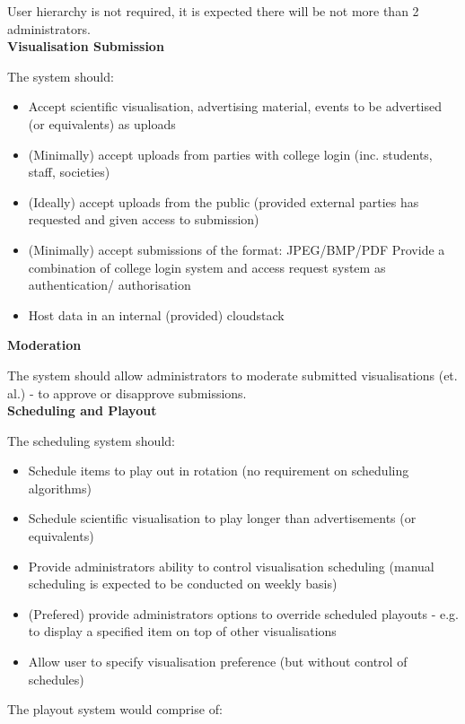 \documentclass[a4paper, titlepage]{article}
\begin{document}
User hierarchy is not required, it is expected there will be not more than 2 administrators.\\

\textbf{\large Visualisation Submission}

The system should:

\begin{itemize}
\item Accept scientific visualisation, advertising material, events to be advertised (or equivalents) as uploads
\item (Minimally) accept uploads from parties with college login (inc. students, staff, societies)
\item (Ideally) accept uploads from the public (provided external parties has requested and given access to submission)
\item (Minimally) accept submissions of the format: JPEG/BMP/PDF Provide a combination of college login system and access request system as authentication/ authorisation
\item Host data in an internal (provided) cloudstack\\
\end{itemize}

\textbf{\large Moderation}

The system should allow administrators to moderate submitted visualisations (et. al.) - to approve or disapprove submissions.\\

\textbf{\large Scheduling and Playout}

The scheduling system should:

\begin{itemize}
\item Schedule items to play out in rotation (no requirement on scheduling algorithms)
\item Schedule scientific visualisation to play longer than advertisements (or equivalents)
\item Provide administrators ability to control visualisation scheduling (manual scheduling is expected to be conducted on weekly basis)
\item (Prefered) provide administrators options to override scheduled playouts - e.g. to display a specified item on top of other visualisations
\item Allow user to specify visualisation preference (but without control of schedules)
\end{itemize}

The playout system would comprise of:
\end{document}
